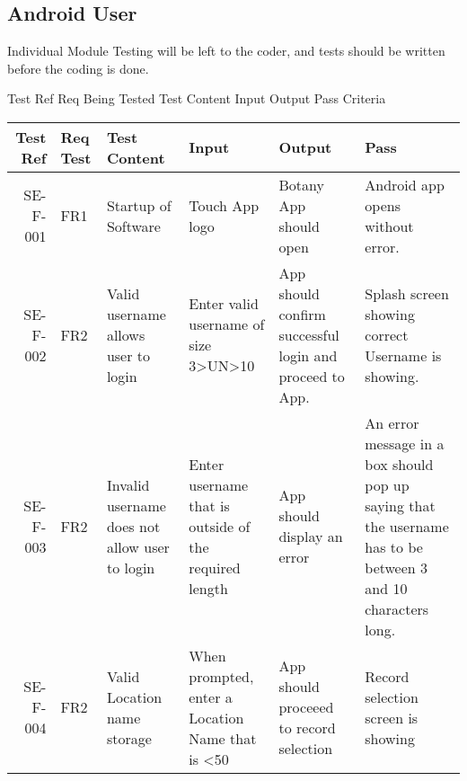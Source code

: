 \subsection{Android User}
	Individual Module Testing will be left to the coder, and tests should be written before the coding is done.

	Test Ref Req Being Tested Test Content Input Output Pass Criteria

	\begin{landscape}
		\begin{longtable}{|r|l|p{4cm}|p{4cm}|p{4cm}|p{4cm}|}
		\hline
		Test Ref & Req Test & Test Content & Input & Output & Pass \\ \hline
		SE-F-001 & FR1 & Startup of Software & Touch App logo & Botany App should open & Android app opens without error. \\ \hline
		SE-F-002 & FR2 & Valid username allows user to login & Enter valid username of size 3>UN>10 & App should confirm successful login and proceed to App. & Splash screen showing correct Username is showing. \\ \hline
		SE-F-003 & FR2 & Invalid username does not allow user to login & Enter username that is outside of the required length &  App should display an error & An error message in a box should pop up saying that the username has to be between 3 and 10 characters long.  \\ \hline
		SE-F-004 & FR2 & Valid Location name storage & When prompted, enter a Location Name that is <50 & App should proceeed to record selection & Record selection screen is showing \\ \hline
		

\end{longtable}
\end{landscape}
